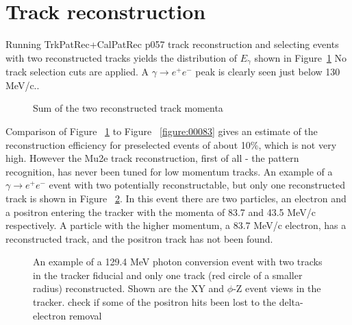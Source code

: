 %
\section{Track reconstruction}
\label{section:track_reconstruction}

Running TrkPatRec+CalPatRec p057 track reconstruction and selecting events
with two reconstructed tracks yields the distribution of $E_\gamma$
shown in Figure~\ref{figure:00084_rpc04b0s54_t2_1_smom_0}
No track selection cuts are applied. A $\gamma \to e^+e^-$ peak  is clearly seen just below
130 MeV/c..

\begin{figure}[H]
  \caption{
    \label{figure:00084_rpc04b0s54_t2_1_smom_0}
    Sum of the two reconstructed track momenta
  }
\end{figure}

Comparison of Figure ~\ref{figure:00084_rpc04b0s54_t2_1_smom_0} 
to Figure ~\ref{figure:00083} gives an estimate of the reconstruction efficiency
for preselected events of about 10\%, which is not very high.
%
However the Mu2e track reconstruction, first of all - the pattern recognition,
has never been tuned for low momentum tracks. An example of a $\gamma \to e^+e^-$
event with two potentially reconstructable, but only one reconstructed track
is shown in Figure ~\ref{figure:event_display}. In this event there are two particles,
an electron and a positron entering the tracker with the momenta of 83.7 and 43.5 MeV/c
respectively. A particle with the higher momentum, a 83.7 MeV/c electron, has a reconstructed track,
and  the positron track has not been found.  

\begin{figure}[H]
  \caption{
    \label{figure:event_display}
    An example of a 129.4 MeV photon conversion event with two tracks
    in the tracker fiducial and only one track (red circle of a smaller radius)
    reconstructed. Shown are the XY and $\phi$-Z event views in the tracker.
    {\red check if some of the positron hits been lost to the delta-electron removal}
  }
\end{figure}

